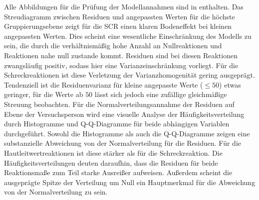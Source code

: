 		Alle Abbildungen für die Prüfung der Modellannahmen sind in  enthalten. 
		Das Streudiagramm zwischen Residuen und angepassten Werten für die höchste Gruppierungsebene zeigt für die SCR einen klaren Bodeneffekt bei kleinen angepassten Werten. Dies scheint eine wesentliche Einschränkung des Modells zu sein, die durch die verhältnismäßig hohe Anzahl an Nullreaktionen und Reaktionen nahe null zustande kommt. Residuen sind bei diesen Reaktionen zwangsläufig positiv, sodass hier eine Varianzeinschränkung vorliegt.
		Für die Schreckreaktionen ist diese Verletzung der Varianzhomogenität gering ausgeprägt. Tendenziell ist die Residuenvarianz für kleine angepasste Werte ($\leq 50$) etwas geringer, für die Werte ab $50$ lässt sich jedoch eine zufällige gleichmäßige Streuung beobachten.
		Für die Normalverteilungsannahme der Residuen auf Ebene der Versuchsperson wird eine visuelle Analyse der Häufigkeitsverteilung durch Histogramme und Q-Q-Diagramme für beide  abhängigen Variablen durchgeführt.
		Sowohl die Histogramme als auch die Q-Q-Diagramme zeigen eine substanzielle Abweichung von der Normalverteilung für die Residuen. Für die Hautleitwertreaktionen ist diese stärker als für die Schreckreaktion. 
		Die Häufigkeitsverteilungen deuten daraufhin, dass die Residuen für beide Reaktionsmaße zum Teil starke Ausreißer aufweisen. Außerdem scheint die ausgeprägte Spitze der Verteilung um Null ein Hauptmerkmal für die Abweichung von der Normalverteilung zu sein.





